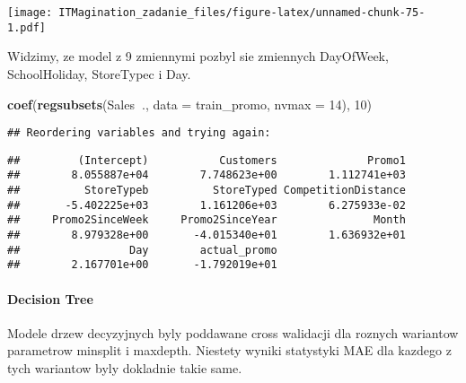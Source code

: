 \documentclass[]{article}
\newenvironment{Shaded}{\begin{snugshade}}{\end{snugshade}}
\newcommand{\DataTypeTok}[1]{\textcolor[rgb]{0.13,0.29,0.53}{#1}}
\newcommand{\DecValTok}[1]{\textcolor[rgb]{0.00,0.00,0.81}{#1}}
\newcommand{\KeywordTok}[1]{\textcolor[rgb]{0.13,0.29,0.53}{\textbf{#1}}}
\newcommand{\NormalTok}[1]{#1}
\newcommand{\OperatorTok}[1]{\textcolor[rgb]{0.81,0.36,0.00}{\textbf{#1}}}
\let\oldparagraph\paragraph
\renewcommand{\paragraph}[1]{\oldparagraph{#1}\mbox{}}
\begin{document}
\texttt{[image: ITMagination\_zadanie\_files/figure-latex/unnamed-chunk-75-1.pdf]}

Widzimy, ze model z 9 zmiennymi pozbyl sie zmiennych DayOfWeek,
SchoolHoliday, StoreTypec i Day.

\begin{Shaded}
\begin{Highlighting}[]
\KeywordTok{coef}\NormalTok{(}\KeywordTok{regsubsets}\NormalTok{(Sales}\OperatorTok{~}\NormalTok{., }\DataTypeTok{data =}\NormalTok{ train_promo, }\DataTypeTok{nvmax =} \DecValTok{14}\NormalTok{), }\DecValTok{10}\NormalTok{)}
\end{Highlighting}
\end{Shaded}

\begin{verbatim}
## Reordering variables and trying again:
\end{verbatim}

\begin{verbatim}
##         (Intercept)           Customers              Promo1 
##        8.055887e+04        7.748623e+00        1.112741e+03 
##          StoreTypeb          StoreTyped CompetitionDistance 
##       -5.402225e+03        1.161206e+03        6.275933e-02 
##     Promo2SinceWeek     Promo2SinceYear               Month 
##        8.979328e+00       -4.015340e+01        1.636932e+01 
##                 Day        actual_promo 
##        2.167701e+00       -1.792019e+01
\end{verbatim}

\hypertarget{decision-tree-1}{%
\paragraph{Decision Tree}\label{decision-tree-1}}

Modele drzew decyzyjnych byly poddawane cross walidacji dla roznych
wariantow parametrow minsplit i maxdepth. Niestety wyniki statystyki MAE
dla kazdego z tych wariantow byly dokladnie takie same.
\end{document}
